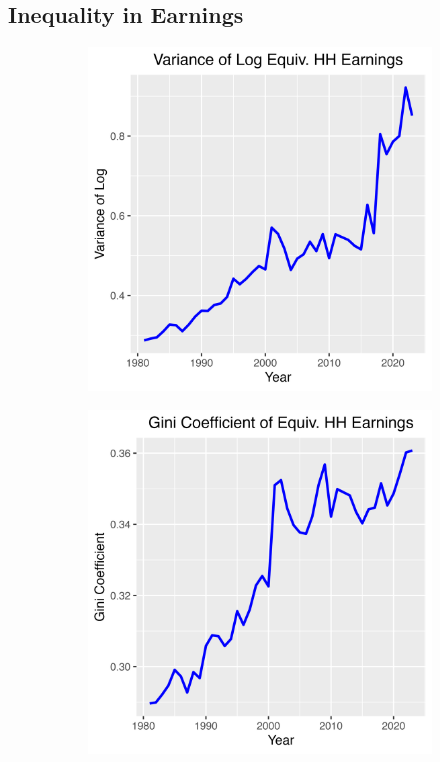 \documentclass{article}
\begin{document}
\subsection{Inequality in Earnings}

\begin{figure}
    \centering
    \begin{subfigure}[t]{0.475\textwidth}
        \centering
        \includegraphics[width=\textwidth]{figures/Fig_1/Fig_1a_Var_Earnings.png}
        \label{fig:earnings_inequality_Var}
    \end{subfigure}
    \begin{subfigure}[t]{0.475\textwidth}
        \centering
        \includegraphics[width=\textwidth]{figures/Fig_1/Fig_1b_Gini_Earnings.png}

\end{subfigure}
\end{figure}
\end{document}
